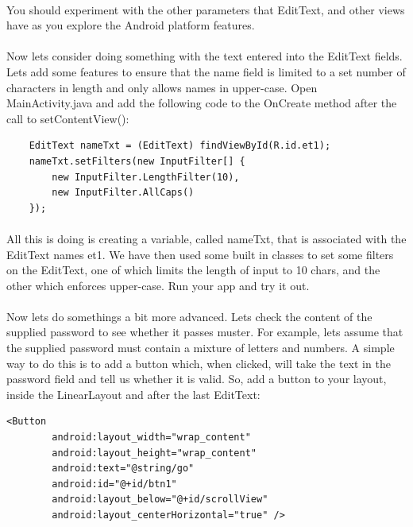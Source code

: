 \paragraph{} You should experiment with the other parameters that EditText, and other views have as you explore the Android platform features.

\paragraph{} Now lets consider doing something with the text entered into the EditText fields. Lets add some features to ensure that the name field is limited to a set number of characters in length and only allows names in upper-case. Open MainActivity.java and add the following code to the OnCreate method after the call to setContentView():

\begin{lstlisting}
    EditText nameTxt = (EditText) findViewById(R.id.et1);
    nameTxt.setFilters(new InputFilter[] {
        new InputFilter.LengthFilter(10),
        new InputFilter.AllCaps()
    });
\end{lstlisting}

\paragraph{} All this is doing is creating a variable, called nameTxt, that is associated with the EditText names et1. We have then used some built in classes to set some filters on the EditText, one of which limits the length of input to 10 chars, and the other which enforces upper-case. Run your app and try it out.

\paragraph{} Now lets do somethings a bit more advanced. Lets check the content of the supplied password to see whether it passes muster. For example, lets assume that the supplied password must contain a mixture of letters and numbers. A simple way to do this is to add a button which, when clicked, will take the text in the password field and tell us whether it is valid. So, add a button to your layout, inside the LinearLayout and after the last EditText:

\begin{lstlisting}
<Button
        android:layout_width="wrap_content"
        android:layout_height="wrap_content"
        android:text="@string/go"
        android:id="@+id/btn1"
        android:layout_below="@+id/scrollView"
        android:layout_centerHorizontal="true" />
\end{lstlisting}

